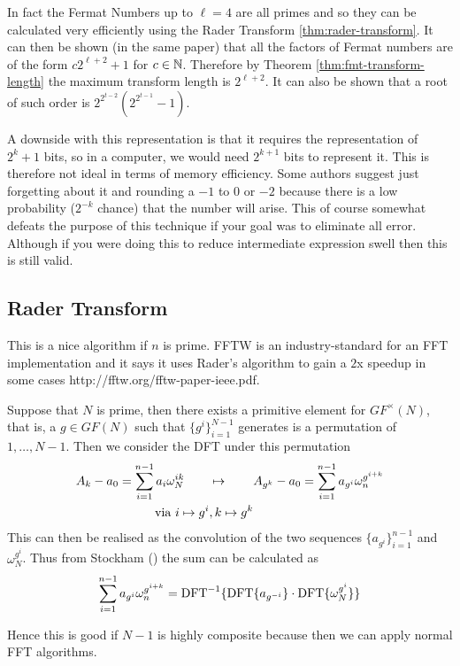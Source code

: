 In fact the Fermat Numbers up to $\ell = 4$ are all primes and so they can be calculated very efficiently using the Rader Transform \ref{thm:rader-transform}. It can then be shown (in the same paper) that all the factors of Fermat numbers are of the form $c2^{\ell + 2} + 1$ for $c \in {\mathbb N}$. Therefore by Theorem \ref{thm:fmt-transform-length} the maximum transform length is $2^{\ell + 2}$. It can also be shown that a root of such order is $2^{2^{t-2}}(2^{2^{t-1}} - 1)$.

A downside with this representation is that it requires the representation of $2^k + 1$ bits, so in a computer, we would need $2^{k+1}$ bits to represent it. This is therefore not ideal in terms of memory efficiency. Some authors suggest just forgetting about it and rounding a $-1$ to $0$ or $-2$ because there is a low probability ($2^{-k}$ chance) that the number will arise. This of course somewhat defeats the purpose of this technique if your goal was to eliminate all error. Although if you were doing this to reduce intermediate expression swell then this is still valid.

\subsection{Rader Transform}
\label{subsec:rt}

This is a nice algorithm if $n$ is prime. FFTW is an industry-standard for an FFT implementation and it says it uses Rader's algorithm to gain a $2$x speedup in some cases http://fftw.org/fftw-paper-ieee.pdf.

\begin{theorem}\label{thm:rader-transform}
    Suppose that $N$ is prime, then there exists a primitive element for $GF^\times(N)$, that is, a $g \in GF(N)$ such that $\{g^i\}_{i=1}^{N-1}$ generates is a permutation of $1, \ldots, N-1$. Then we consider the DFT under this permutation
    \begin{align*}
      A_k - a_0 = \sum^{n-1}_{i=1} a_i \omega_N^{ik} \qquad &\mapsto \qquad A_{g^k} - a_0 = \sum^{n-1}_{i=1} a_{g^i}\omega_n^{g^{i+k}}\\
      \textrm{ via } i \mapsto g^i&, k \mapsto g^k
    \end{align*}
    This can then be realised as the convolution of the two sequences $\{a_{g^i}\}_{i=1}^{n-1}$ and $\omega_N^{g^i}$. Thus from Stockham (\cite{stockham}) the sum can be calculated as
    \[
      \sum^{n-1}_{i=1} a_{g^i}\omega_n^{g^{i+k}} = \textrm{DFT}^{-1}\{\textrm{DFT}\{a_{g^{-i}}\}\cdot \textrm{DFT}\{\omega_N^{g^i}\}\}
    \]
\end{theorem}
Hence this is good if $N - 1$ is highly composite because then we can apply normal FFT algorithms.

